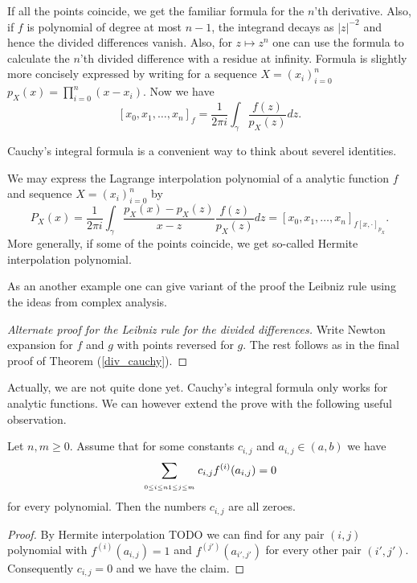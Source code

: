 If all the points coincide, we get the familiar formula for the $n$'th derivative. Also, if $f$ is polynomial of degree at most $n - 1$, the integrand decays as $|z|^{-2}$ and hence the divided differences vanish. Also, for $z \mapsto z^{n}$ one can use the formula to calculate the $n$'th divided difference with a residue at infinity. Formula is slightly more concisely expressed by writing for a sequence $X = (x_{i})_{i = 0}^{n}$ $p_{X}(x) = \prod_{i = 0}^{n} (x - x_{i})$. Now we have
\[
	[x_{0}, x_{1}, \ldots, x_{n}]_{f} = \frac{1}{2 \pi i} \int_{\gamma} \frac{f(z)}{p_{X}(z)} dz.
\]

Cauchy's integral formula is a convenient way to think about severel identities.

\begin{esim}
We may express the Lagrange interpolation polynomial of a analytic function $f$ and sequence $X = (x_{i})_{i = 0}^{n}$ by
\[
	P_{X}(x) = \frac{1}{2 \pi i} \int_{\gamma} \frac{p_{X}(x) - p_{X}(z)}{x - z}\frac{f(z)}{p_{X}(z)} dz = [x_{0}, x_{1}, \ldots, x_{n}]_{f [x, \cdot]_{p_{X}}}.
\]
More generally, if some of the points coincide, we get so-called Hermite interpolation polynomial.
\end{esim}
As an another example one can give variant of the proof the Leibniz rule using the ideas from complex analysis.
\begin{proof}[Alternate proof for the Leibniz rule for the divided differences]
	Write Newton expansion for $f$ and $g$ with points reversed for $g$. The rest follows as in the final proof of Theorem (\ref{div_cauchy}).
\end{proof}

Actually, we are not quite done yet. Cauchy's integral formula only works for analytic functions. We can however extend the prove with the following useful observation.
\begin{lem}\label{bootstrap_lemma}
	Let $n, m \geq 0$. Assume that for some constants $c_{i, j}$ and $a_{i, j} \in (a, b)$ we have
	\begin{align*}
	\sum_{\atop{0 \leq i \leq n}{1 \leq j \leq m}} c_{i, j} f^{(i)}(a_{i, j}) = 0
	\end{align*}
	for every polynomial. Then the numbers $c_{i, j}$ are all zeroes.
\end{lem}
\begin{proof}
	By Hermite interpolation TODO we can find for any pair $(i, j)$ polynomial with $f^{(i)}(a_{i, j}) = 1$ and $f^{(j')}(a_{i', j'})$ for every other pair $(i', j')$. Consequently $c_{i, j} = 0$ and we have the claim.
\end{proof}

